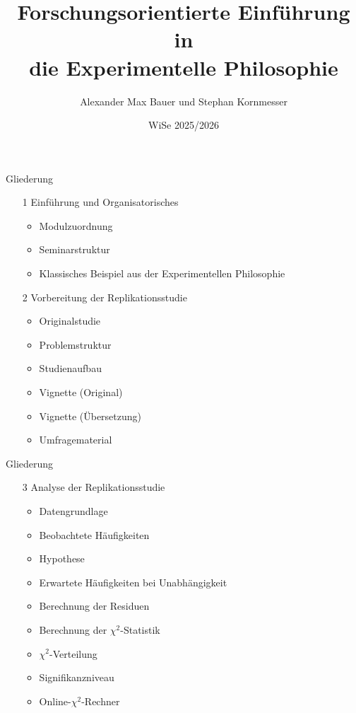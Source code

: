 \documentclass[xcolor=table,9pt,aspectratio=169]{beamer}
\title{Forschungsorientierte Einführung in \\die Experimentelle Philosophie}
\subtitle{}
\author{Alexander Max Bauer und Stephan Kornmesser}
\date{WiSe 2025/2026}
\begin{document}
{
\begin{frame}
   \maketitle
\end{frame}
}

\begin{frame}{\vspace*{10mm}Gliederung}
\begin{itemize}
   \item[1] Einführung und Organisatorisches
   \begin{itemize}
      \item Modulzuordnung
      \item Seminarstruktur
      \item Klassisches Beispiel aus der Experimentellen Philosophie
   \end{itemize}
   \item[2] Vorbereitung der Replikationsstudie
   \begin{itemize}
      \item Originalstudie
      \item Problemstruktur
      \item Studienaufbau
      \item Vignette (Original)
      \item Vignette (Übersetzung)
      \item Umfragematerial
   \end{itemize}
\end{itemize}
\end{frame}


\begin{frame}{\vspace*{10mm}Gliederung}
\begin{itemize}
   \item[3] Analyse der Replikationsstudie
   \begin{itemize}
      \item Datengrundlage
      \item Beobachtete Häufigkeiten
      \item Hypothese
      \item Erwartete Häufigkeiten bei Unabhängigkeit
      \item Berechnung der Residuen
      \item Berechnung der $\chi^{2}$-Statistik
      \item $\chi^2$-Verteilung
      \item Signifikanzniveau
      \item Online-$\chi^2$-Rechner
   \end{itemize}
\end{itemize}
\end{frame}
\end{document}
